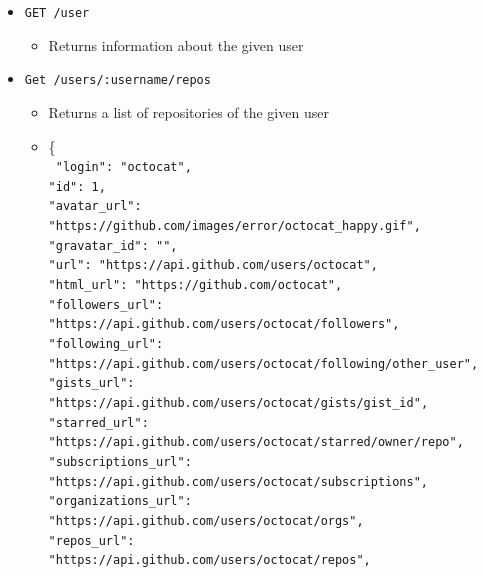 \documentclass[11pt]{article}
\begin{document}
\begin{itemize}
   \item{\texttt{GET /user}}
	\begin{itemize}
	   \item{Returns information about the given user}
	\end{itemize}
   \item{\texttt{Get /users/:username/repos}}
	\begin{itemize}
	   \item{Returns a list of repositories of the given user}
	   \item{ \{\\
		\texttt{
			  \textcolor{r}{"login"}: \textcolor{b}{"octocat"},\\
			  \textcolor{r}{"id": 1},\\
			  \textcolor{r}{"avatar\_url"}: \textcolor{b}{"https://github.com/images/error/octocat\_happy.gif"},\\
			  \textcolor{r}{"gravatar\_id"}: \textcolor{b}{""},\\
			  \textcolor{r}{"url"}: \textcolor{b}{"https://api.github.com/users/octocat"},\\
			  \textcolor{r}{"html\_url"}: \textcolor{b}{"https://github.com/octocat"},\\
			  \textcolor{r}{"followers\_url"}: \\\textcolor{b}{"https://api.github.com/users/octocat/followers"},\\
			  \textcolor{r}{"following\_url"}: \\\textcolor{b}{"https://api.github.com/users/octocat/following{/other\_user}"},\\
			  \textcolor{r}{"gists\_url"}: \\\textcolor{b}{"https://api.github.com/users/octocat/gists{/gist\_id}"},\\
			  \textcolor{r}{"starred\_url"}: \\\textcolor{b}{"https://api.github.com/users/octocat/starred{/owner}{/repo}"},\\
			  \textcolor{r}{"subscriptions\_url"}: \\\textcolor{b}{"https://api.github.com/users/octocat/subscriptions"},\\
			  \textcolor{r}{"organizations\_url"}: \\\textcolor{b}{"https://api.github.com/users/octocat/orgs"},\\
			  \textcolor{r}{"repos\_url"}: \\\textcolor{b}{"https://api.github.com/users/octocat/repos"},\\
}}
\end{itemize}
\end{itemize}
\end{document}
